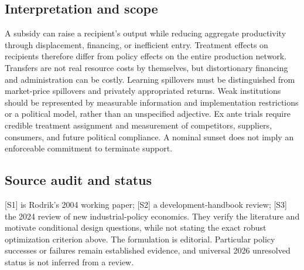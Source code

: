 \documentclass[11pt,a4paper]{article}
\begin{document}
\subsection*{Interpretation and scope}
A subsidy can raise a recipient's output while reducing aggregate productivity through displacement, financing, or inefficient entry. Treatment effects on recipients therefore differ from policy effects on the entire production network. Transfers are not real resource costs by themselves, but distortionary financing and administration can be costly. Learning spillovers must be distinguished from market-price spillovers and privately appropriated returns. Weak institutions should be represented by measurable information and implementation restrictions or a political model, rather than an unspecified adjective. Ex ante trials require credible treatment assignment and measurement of competitors, suppliers, consumers, and future political compliance. A nominal sunset does not imply an enforceable commitment to terminate support.
\subsection*{Source audit and status}
[S1] is Rodrik's 2004 working paper; [S2] a development-handbook review; [S3] the 2024 review of new industrial-policy economics. They verify the literature and motivate conditional design questions, while not stating the exact robust optimization criterion above. The formulation is editorial. Particular policy successes or failures remain established evidence, and universal 2026 unresolved status is not inferred from a review.
\end{document}
